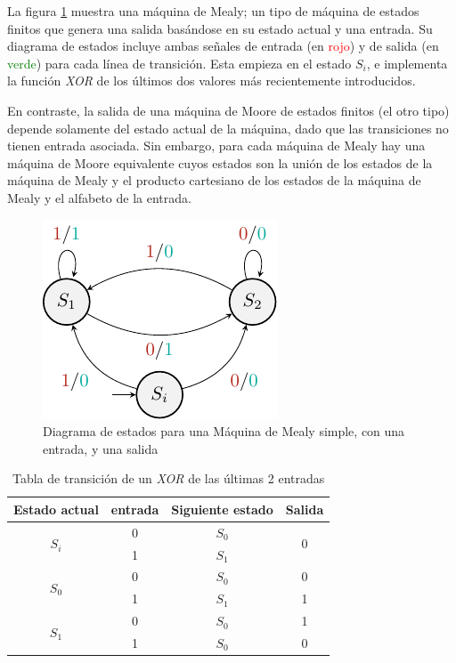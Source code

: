 \documentclass[journal,trans]{IEEEtran}
\begin{document}
	La figura \ref{fig:machineMealy} muestra una máquina de Mealy; un tipo de máquina de estados finitos que genera una salida basándose en su estado actual y una entrada. Su diagrama de estados incluye ambas señales de entrada (en \textcolor{red}{rojo}) y de salida (en \textcolor{green}{verde}) para cada línea de transición. Esta empieza en el estado $S_{i}$, e implementa la función \emph{XOR} de los últimos dos valores m\'as recientemente introducidos.
	
	En contraste, la salida de una máquina de Moore de estados finitos (el otro tipo) depende solamente del estado actual de la máquina, dado que las transiciones no tienen entrada asociada. Sin embargo, para cada máquina de Mealy hay una máquina de Moore equivalente cuyos estados son la unión de los estados de la máquina de Mealy y el producto cartesiano de los estados de la máquina de Mealy y el alfabeto de la entrada.
	
	\begin{figure}[h]
		\centering
		\includegraphics{./imagenes/machineMealy.pdf}
		\caption{Diagrama de estados para una Máquina de Mealy simple, con una entrada, y una salida}
		\label{fig:machineMealy}
	\end{figure}
	
	\begin{table}[h]
		\centering
		\bgroup
		\def\arraystretch{1.5}
		\begin{tabular}{|c|c|c|c|}
			\hline
			Estado actual & entrada & Siguiente estado & Salida \\
			\hline
			\multirow{2}{*}{$S_{i}$} & 0 & $S_{0}$ & \multirow{2}{*}{0} \\
			\cline{2-3}
			& 1 & $S_{1}$ &  \\
			\hline
			\multirow{2}{*}{$S_{0}$} & 0 & $S_{0}$ & 0 \\
			\cline{2-4}
			& 1 & $S_{1}$ & 1 \\
			\hline
			\multirow{2}{*}{$S_{1}$} & 0 & $S_{0}$ & 1 \\
			\cline{2-4}
			& 1 & $S_{0}$ & 0 \\
			\hline
		\end{tabular}
		\egroup
		\caption{Tabla de transición de un \textit{XOR} de las últimas 2 entradas}
		\label{tab:tableMealy}
	\end{table}
\end{document}
